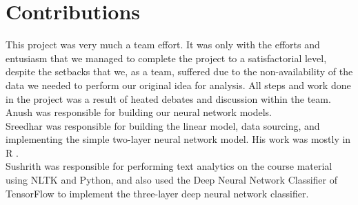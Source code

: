 \documentclass[conference]{IEEEtran}
\begin{document}
	\section*{Contributions}
This project was very much a team effort. It was only with the efforts and entusiasm that we managed to complete the project to a satisfactorial level, despite the setbacks that we, as a team, suffered due to the non-availability of the data we needed to perform our original idea for analysis. All steps and work done in the project was a result of heated debates and discussion within the team.\\
Anush was responsible for building our neural network models.\\
Sreedhar was responsible for building the linear model, data sourcing, and implementing the simple two-layer neural network model. His work was mostly in R \cite{r}.\\
Sushrith was responsible for performing text analytics on the course material using NLTK \cite{Loper02nltk:the} and Python, and also used the Deep Neural Network Classifier of TensorFlow \cite{tensorflow2015-whitepaper} to implement the three-layer deep neural network classifier.



\end{document}
